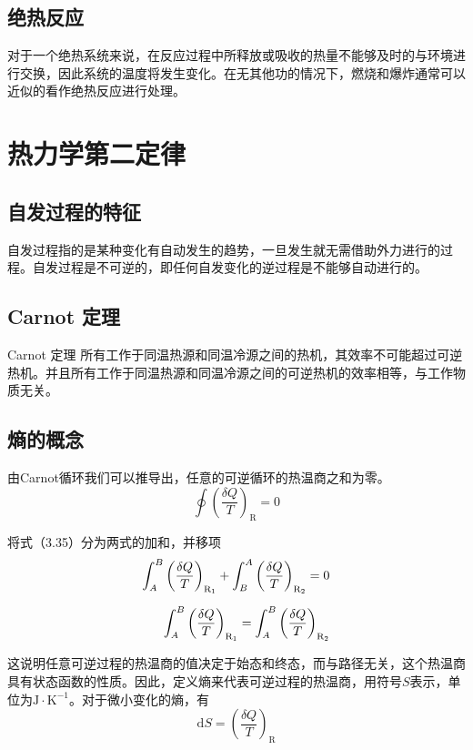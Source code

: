 \documentclass[lang=cn,newtx,10pt,scheme=chinese]{elegantbook}
\begin{document}
\subsection{绝热反应}
对于一个绝热系统来说，在反应过程中所释放或吸收的热量不能够及时的与环境进行交换，因此系统的温度将发生变化。在无其他功的情况下，燃烧和爆炸通常可以近似的看作绝热反应进行处理。

\section{热力学第二定律}
\subsection{自发过程的特征}
自发过程指的是某种变化有自动发生的趋势，一旦发生就无需借助外力进行的过程。自发过程是不可逆的，即任何自发变化的逆过程是不能够自动进行的。

\subsection{Carnot 定理}
\begin{theorem}{Carnot 定理}
	所有工作于同温热源和同温冷源之间的热机，其效率不可能超过可逆热机。并且所有工作于同温热源和同温冷源之间的可逆热机的效率相等，与工作物质无关。
\end{theorem}

\subsection{熵的概念}
由Carnot循环我们可以推导出，任意的可逆循环的热温商之和为零。
\begin{equation}
	\oint \left ( \frac{\delta Q}{T}  \right ) _\mathrm{R} =0
\end{equation}

将式（3.35）分为两式的加和，并移项
\begin{equation}
	\begin{aligned}
		\int_{A}^{B} \left ( \frac{\delta Q}{T}  \right )_{\mathrm{R_1} }+\int_{B}^{A} \left ( \frac{\delta Q}{T}  \right )_{\mathrm{R_2} } =0 \\[1.5ex]
		\int_{A}^{B} \left ( \frac{\delta Q}{T}  \right )_{\mathrm{R_1} } =\int_{A}^{B} \left ( \frac{\delta Q}{T}  \right )_{\mathrm{R_2} }
	\end{aligned} \notag
\end{equation}

这说明任意可逆过程的热温商的值决定于始态和终态，而与路径无关，这个热温商具有状态函数的性质。因此，定义熵来代表可逆过程的热温商，用符号$S$表示，单位为$\mathrm{J \cdot K^{-1}}$。对于微小变化的熵，有
\begin{equation}
	\mathrm{d}S=\left ( \frac{\delta Q}{T}  \right )_{\mathrm{R} }  
\end{equation}
\end{document}
